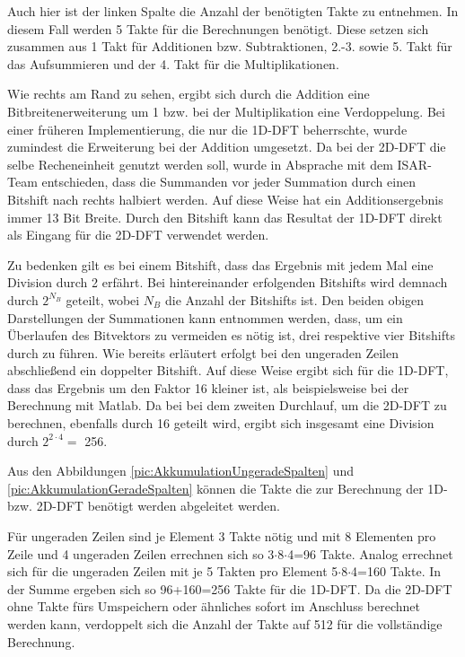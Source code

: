 \vspace{1cm}
Auch hier ist der linken Spalte die Anzahl der benötigten Takte zu entnehmen. In diesem Fall werden 5 Takte für die Berechnungen benötigt. Diese setzen sich zusammen aus
1 Takt für Additionen bzw. Subtraktionen, 2.-3. sowie 5. Takt für das Aufsummieren und der 4. Takt für die Multiplikationen.

Wie rechts am Rand zu sehen, ergibt sich durch die Addition eine Bitbreitenerweiterung um 1 bzw. bei der Multiplikation eine Verdoppelung. Bei einer früheren 
Implementierung, die nur die 1D-DFT beherrschte, wurde zumindest die Erweiterung bei der Addition umgesetzt. Da bei der 2D-DFT die selbe Recheneinheit genutzt 
werden soll, wurde in Absprache mit dem ISAR-Team entschieden, dass die Summanden vor jeder Summation durch einen Bitshift nach rechts halbiert werden. Auf diese
Weise hat ein Additionsergebnis immer 13 Bit Breite. Durch den Bitshift kann das Resultat der 1D-DFT direkt als Eingang für die 2D-DFT verwendet werden. 

Zu bedenken gilt es bei einem Bitshift, dass das Ergebnis mit jedem Mal eine Division durch 2 erfährt. Bei hintereinander erfolgenden Bitshifts wird demnach durch $2^{N_B}$ geteilt, 
wobei $N_B$ die Anzahl der Bitshifts ist. Den beiden obigen Darstellungen der Summationen kann entnommen werden, dass, um ein Überlaufen des Bitvektors zu vermeiden es nötig ist,
drei respektive vier Bitshifts durch zu führen. Wie bereits erläutert erfolgt bei den ungeraden Zeilen abschließend ein doppelter Bitshift. Auf diese Weise ergibt sich für die
1D-DFT, dass das Ergebnis um den Faktor 16 kleiner ist, als beispielsweise bei der Berechnung mit Matlab. Da bei bei dem zweiten Durchlauf, um die 2D-DFT zu berechnen, ebenfalls 
durch 16 geteilt wird, ergibt sich insgesamt eine Division durch $2^{2\cdot4} = $ 256.


Aus den Abbildungen \ref{pic:AkkumulationUngeradeSpalten} und \ref{pic:AkkumulationGeradeSpalten} können die Takte die zur Berechnung der 1D- bzw. 2D-DFT benötigt werden 
abgeleitet werden.

Für ungeraden Zeilen sind je Element 3 Takte nötig und mit 8 Elementen pro Zeile und 4 ungeraden Zeilen errechnen sich so 3$\cdot$8$\cdot$4=96 Takte.
Analog errechnet sich für die ungeraden Zeilen mit je 5 Takten pro Element 5$\cdot$8$\cdot$4=160 Takte.
In der Summe ergeben sich so 96+160=256 Takte für die 1D-DFT. Da die 2D-DFT ohne Takte fürs Umspeichern oder ähnliches sofort im Anschluss berechnet werden kann, 
verdoppelt sich die Anzahl der Takte auf 512 für die vollständige Berechnung.









